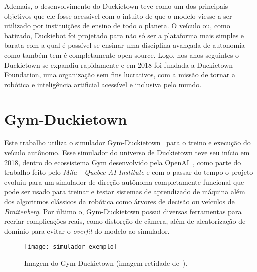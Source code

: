 Ademais, o desenvolvimento do Duckietown teve como um dos principais objetivos que ele fosse acessível com o intuito de que o modelo viesse a ser utilizado por instituições de ensino de todo o planeta. O veículo ou, como batizado, Duckiebot foi projetado para não só ser a plataforma mais simples e barata com a qual é possível se ensinar uma disciplina avançada de autonomia como também tem é completamente open source. Logo, nos anos seguintes o Duckietown se expandiu rapidamente e em 2018 foi fundada a Duckietown Foundation, uma organização sem fins lucrativos, com a missão de tornar a robótica e inteligência artificial acessível e inclusiva pelo mundo. 

\section{Gym-Duckietown}

Este trabalho utiliza o simulador Gym-Duckietown~\citep{gym-duckietown} para o treino e execução do veículo autônomo. Esse simulador do universo de Duckietown teve seu início em 2018, dentro do ecossistema Gym desenvolvido pela OpenAI~\citep{1606.01540}, como parte do trabalho feito pelo \textit{Mila - Quebec AI Institute} e com o passar do tempo o projeto evoluiu para um simulador de direção autônoma completamente funcional que pode ser usado para treinar e testar sistemas de aprendizado de máquina além dos algoritmos clássicos da robótica como árvores de decisão ou veículos de \textit{Braitenberg}. Por último o, Gym-Duckietown possui diversas ferramentas para recriar complicações reais, como distorção de câmera, além de aleatorização de domínio para evitar o \textit{overfit} do modelo ao simulador.

\begin{figure}
	\centering
	\texttt{[image: simulador\_exemplo]}
	\caption{Imagem do Gym Duckietown (imagem retidade de~\citep{gym-duckietown}).\label{fig:simulador_exemplo}}
\end{figure}


